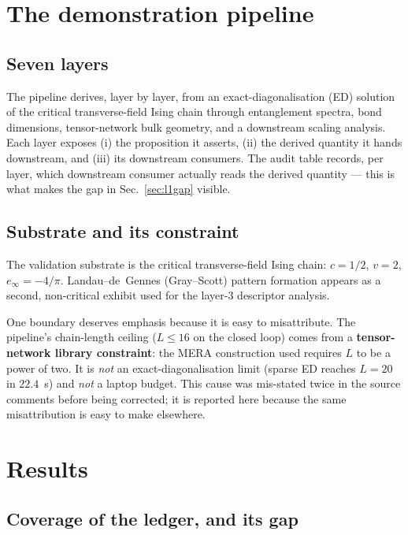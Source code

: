 \documentclass[11pt,a4paper]{article}
\begin{document}
\section{The demonstration pipeline}
\label{sec:pipeline}

\subsection{Seven layers}

The pipeline derives, layer by layer, from an exact-diagonalisation (ED) solution
of the critical transverse-field Ising chain through entanglement spectra, bond
dimensions, tensor-network bulk geometry, and a downstream scaling analysis. Each
layer exposes (i) the proposition it asserts, (ii) the derived quantity it hands
downstream, and (iii) its downstream consumers. The audit table records, per layer,
which downstream consumer actually reads the derived quantity --- this is what makes
the gap in Sec.~\ref{sec:l1gap} visible.

\subsection{Substrate and its constraint}
\label{sec:substrate}

The validation substrate is the critical transverse-field Ising chain: $c = 1/2$,
$v = 2$, $e_\infty = -4/\pi$. Landau--de~Gennes (Gray--Scott) pattern formation
appears as a second, non-critical exhibit used for the layer-3 descriptor analysis.

One boundary deserves emphasis because it is easy to misattribute. The pipeline's
chain-length ceiling ($L \le 16$ on the closed loop) comes from a
\textbf{tensor-network library constraint}: the MERA construction used requires $L$
to be a power of two. It is \emph{not} an exact-diagonalisation limit (sparse ED
reaches $L = 20$ in $22.4$~s) and \emph{not} a laptop budget. This cause was
mis-stated twice in the source comments before being corrected; it is reported here
because the same misattribution is easy to make elsewhere.

\section{Results}
\label{sec:results}

\subsection{Coverage of the ledger, and its gap}
\label{sec:gaps}
\end{document}
